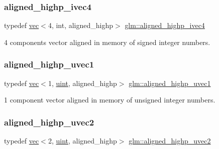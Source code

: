 \subsubsection{\texorpdfstring{aligned\+\_\+highp\+\_\+ivec4}{aligned\_highp\_ivec4}}
{\footnotesize\ttfamily typedef \mbox{\hyperlink{structglm_1_1vec}{vec}}$<$4, int, aligned\+\_\+highp$>$ \mbox{\hyperlink{group__gtc__type__aligned_gabbac4883efc1760f4efb450753794f2d}{glm\+::aligned\+\_\+highp\+\_\+ivec4}}}



4 components vector aligned in memory of signed integer numbers. 

\mbox{\label{group__gtc__type__aligned_ga3ba8c6f6b81f57159b0536ce5d4339d0}} 
\subsubsection{\texorpdfstring{aligned\+\_\+highp\+\_\+uvec1}{aligned\_highp\_uvec1}}
{\footnotesize\ttfamily typedef \mbox{\hyperlink{structglm_1_1vec}{vec}}$<$1, \mbox{\hyperlink{group__core__precision_ga4fd29415871152bfb5abd588334147c8}{uint}}, aligned\+\_\+highp$>$ \mbox{\hyperlink{group__gtc__type__aligned_ga3ba8c6f6b81f57159b0536ce5d4339d0}{glm\+::aligned\+\_\+highp\+\_\+uvec1}}}



1 component vector aligned in memory of unsigned integer numbers. 

\mbox{\label{group__gtc__type__aligned_ga4497b2f3be81910c7a1bf632b51ac9a6}} 
\subsubsection{\texorpdfstring{aligned\+\_\+highp\+\_\+uvec2}{aligned\_highp\_uvec2}}
{\footnotesize\ttfamily typedef \mbox{\hyperlink{structglm_1_1vec}{vec}}$<$2, \mbox{\hyperlink{group__core__precision_ga4fd29415871152bfb5abd588334147c8}{uint}}, aligned\+\_\+highp$>$ \mbox{\hyperlink{group__gtc__type__aligned_ga4497b2f3be81910c7a1bf632b51ac9a6}{glm\+::aligned\+\_\+highp\+\_\+uvec2}}}



